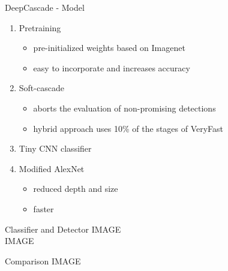 \begin{frame}{DeepCascade - Model}
\small
\begin{enumerate}
  \item Pretraining
  \begin{itemize}
    \item pre-initialized weights based on Imagenet
    \item easy to incorporate and increases accuracy
  \end{itemize}

  \item Soft-cascade
  \begin{itemize}
    \item aborts the evaluation of non-promising detections
    \item hybrid approach uses 10\% of the stages of VeryFast
  \end{itemize}

  \item Tiny CNN classifier

  \item Modified AlexNet
  \begin{itemize}
    \item reduced depth and size
    \item faster
  \end{itemize}
\end{enumerate}
\end{frame}

\begin{frame}{Classifier and Detector}
  IMAGE\\
  IMAGE
\end{frame}

\begin{frame}{Comparison}
  IMAGE
\end{frame}

